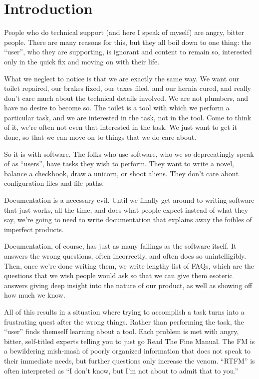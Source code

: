 \chapter{Introduction}

People who do technical support (and here I speak of myself)
are angry, bitter people. There are many
reasons for this, but they all boil down to one thing: the ``user'', who
they are supporting, is ignorant and content to remain so, interested
only in the quick fix and moving on with their life.

What we neglect to notice is that we are exactly the same way. We want
our toilet repaired, our brakes fixed, our taxes filed, and our hernia
cured, and really don't care much about the technical details involved.
We are not plumbers, and have no desire to become so. The toilet is a tool
with which we perform a particular task, and we are interested in the
task, not in the tool. Come to think of it, we're often not even that
interested in the task. We just want to get it done, so that we can move
on to things that we do care about.

So it is with software. The folks who use software, who we so
deprecatingly speak of as ``users'', have tasks they wish to perform.
They want to write a novel, balance a checkbook, draw a unicorn, or
shoot aliens. They don't care about configuration files and file paths.

Documentation is a necessary evil. Until we finally get around to
writing software that just works, all the time, and does what people
expect instead of what they say, we're going to need to write
documentation that explains away the foibles of imperfect products.

Documentation, of course, has just as many failings as the software
itself. It answers the wrong questions, often incorrectly, and often
does so unintelligibly. Then, once we're done writing them, we write
lengthy list of FAQs, which are the questions that we wish people would
ask so that we can give them esoteric answers giving deep insight into
the nature of our product, as well as showing off how much we know.

All of this results in a situation where trying to accomplish a task
turns into a frustrating quest after the wrong things. Rather than 
performing the task, the ``user'' finds themself learning about a tool.
Each problem is met with angry, bitter,
self-titled experts telling you to just go Read The Fine Manual. The FM
is a bewildering mish-mash of poorly organized information that does not
speak to their immediate needs, but further questions only increase the
venom. ``RTFM'' is often interpreted as ``I don't know, but I'm not
about to admit that to you.''

